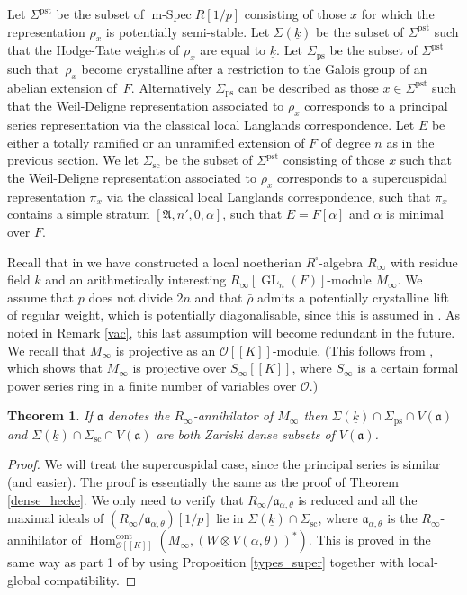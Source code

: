 \documentclass[11pt]{article}
\let\mathcal\mathscr
\newcommand{\ssquare}{{\scriptscriptstyle\square}}
\newcommand{\rps}{\mathrm{ps}}
\newcommand{\rsc}{\mathrm{sc}}
\newtheorem{thm}[prop]{Theorem}
\theoremstyle{definition}
\DeclareMathOperator{\Hom}{Hom}
\DeclareMathOperator{\GL}{GL}
\DeclareMathOperator{\mSpec}{m-Spec}
\newcommand{\br}[1]{[\![#1]\!]}
\newcommand{\Aa}{\mathfrak A}
\newcommand{\cO}{\mathcal{O}}
\newcommand{\cont}{\mathrm{cont}}
\newcommand{\pst}{\mathrm{pst}}
\newcommand{\rhobar}{\bar{\rho}}
\begin{document}
Let $\Sigma^{\pst}$ be the subset of $\mSpec R[1/p]$ consisting of those
$x$ for which the representation $\rho_x$ is potentially semi-stable. Let $\Sigma(\underline{k})$ be the subset of $\Sigma^{\pst}$
such that the Hodge-Tate weights of $\rho_x$ are equal to $\underline{k}$. Let $\Sigma_{\rps}$ be the subset of $\Sigma^{\pst}$
such that~$\rho_x$ become crystalline after a restriction to the Galois group of an abelian extension of~$F$. Alternatively $\Sigma_{\rps}$ can be described
as those $x\in \Sigma^{\pst}$ such that the Weil-Deligne representation associated to $\rho_x$ corresponds to a principal series representation via the
classical local Langlands correspondence. Let $E$ be either a totally ramified or an unramified extension of $F$ of degree $n$ as in the previous section. We
let $\Sigma_{\rsc}$ be the subset of $\Sigma^{\pst}$ consisting of those $x$ such that the Weil-Deligne representation associated to $\rho_x$ corresponds to
a supercuspidal representation $\pi_x$ via the classical local Langlands correspondence, such that $\pi_x$ contains a simple stratum $[\Aa, n', 0, \alpha]$, such that $E=F[\alpha]$ and $\alpha$ is minimal over $F$.

Recall that in \cite{six-authors} we have constructed a local noetherian $R^\ssquare$-algebra $R_{\infty}$ with residue field $k$ and an arithmetically interesting $R_{\infty}[\GL_n(F)]$-module $M_{\infty}$. We assume that
$p$ does not divide $2n$ and that $\rhobar$ admits a potentially crystalline lift of regular weight, which is
potentially diagonalisable, since this is assumed in \cite{six-authors}. As noted in Remark \ref{vac}, this last assumption will become redundant in the future.
We recall that $M_{\infty}$ is projective as an $\cO\br{K}$-module.
(This follows from \cite[Prop.\,2.10]{six-authors}, which
shows that $M_{\infty}$ is projective over $S_{\infty}\br{K}$,
where $S_{\infty}$ is a certain formal power series ring in a finite
number of variables over $\cO$.)

\begin{thm}\label{capture_local} If $\mathfrak a$ denotes
the $R_{\infty}$-annihilator of $M_{\infty}$
then $\Sigma(\underline{k}) \cap \Sigma_{\rps}\cap V(\mathfrak a)$ and
$\Sigma(\underline{k}) \cap \Sigma_{\rsc}\cap V(\mathfrak a)$ are both Zariski dense
subsets of $V(\mathfrak a)$.
\end{thm}

\begin{proof} We will treat the supercuspidal case, since
the principal series is similar (and easier).
The proof is essentially the same as the proof of Theorem \ref{dense_hecke}. We only need to verify that $R_{\infty}/\mathfrak a_{\alpha, \theta}$ is reduced and all the maximal ideals of $(R_{\infty}/\mathfrak a_{\alpha, \theta})[1/p]$ lie in $\Sigma(\underline{k})\cap \Sigma_{\rsc}$, where
$\mathfrak a_{\alpha, \theta}$ is the $R_{\infty}$-annihilator of $\Hom_{\cO\br{K}}^{\cont}(M_\infty, (W\otimes V(\alpha, \theta))^*)$. This is proved in the same way as
part 1 of \cite[Lem.\,4.17]{six-authors} by using Proposition \ref{types_super} together with local-global compatibility.
\end{proof}
\end{document}
